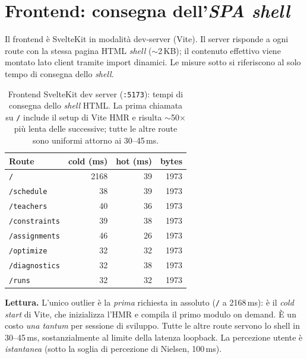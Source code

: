 \section{Frontend: consegna dell'\emph{SPA shell}}

Il frontend \`e SvelteKit in modalit\`a dev-server (Vite).
Il server risponde a ogni route con la stessa pagina HTML
\emph{shell} ($\sim$2\,KB); il contenuto effettivo viene
montato lato client tramite import dinamici. Le misure sotto
si riferiscono al solo tempo di consegna dello \emph{shell}.


\begin{table}[h]
\centering\sffamily\small
\begin{tabular}{lrrr}
\toprule
Route          & cold (ms) & hot (ms) & bytes \\
\midrule
\texttt{/}              & 2168 & 39 & 1973 \\
\texttt{/schedule}      &   38 & 39 & 1973 \\
\texttt{/teachers}      &   40 & 36 & 1973 \\
\texttt{/constraints}   &   39 & 38 & 1973 \\
\texttt{/assignments}   &   46 & 26 & 1973 \\
\texttt{/optimize}      &   32 & 32 & 1973 \\
\texttt{/diagnostics}   &   32 & 38 & 1973 \\
\texttt{/runs}          &   32 & 32 & 1973 \\
\bottomrule
\end{tabular}
\caption{Frontend SvelteKit dev server (\texttt{:5173}):
tempi di consegna dello \emph{shell} HTML. La prima
chiamata su \texttt{/} include il setup di Vite HMR e
risulta $\sim$50$\times$ pi\`u lenta delle successive; tutte
le altre route sono uniformi attorno ai 30--45\,ms.}
\label{tab:ui-frontend-times}
\end{table}

\textbf{Lettura.} L'unico outlier \`e la \emph{prima} richiesta
in assoluto (\texttt{/} a 2168\,ms): \`e il \emph{cold start}
di Vite, che inizializza l'HMR e compila il primo modulo on
demand. \`E un costo \emph{una tantum} per sessione di
sviluppo. Tutte le altre route servono lo shell in 30--45\,ms,
sostanzialmente al limite della latenza loopback. La
percezione utente \`e \emph{istantanea} (sotto la soglia di
percezione di Nielsen, 100\,ms).

